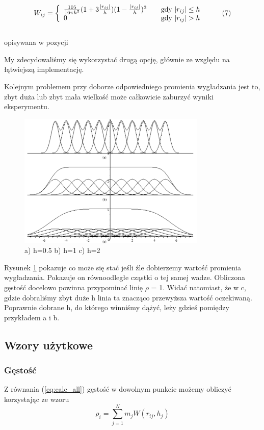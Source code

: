 \documentclass[polish, 12pt]{aghthesis}
\begin{document}
			\[ W_{ij} = \left\{
				\begin{array}{l l}
					\frac{105}{16 \pi h^5}(1 + 3 \frac{|r_{ij}|}{h})(1-\frac{|r_{ij}|}{h})^3 & \quad \text{gdy ${|r_{ij}| \leq h}$}  \\ 0 & \quad \text{gdy ${|r_{ij}| > h}$} 
				\end{array} \right.\ \label{eq:kernel_function} \tag{7}\]
			\ \\
			opisywana w pozycji \cite{Lucy}
			
			My zdecydowaliśmy się wykorzystać drugą opcję, głównie ze względu na łątwiejszą implementację. 
			
			Kolejnym problemem przy doborze odpowiedniego promienia wygładzania jest to, zbyt duża lub zbyt mała wielkość może całkowicie zaburzyć wyniki eksperymentu.
			\begin{figure}[h!]
			\centering
			\includegraphics[width=0.8\textwidth]{smoothing.png}
			\caption{a) h=0.5 b) h=1 c) h=2}
			\label{fig:smoothing}
			\end{figure}
			Rysunek \ref{fig:smoothing} pokazuje co może się stać jeśli źle dobierzemy wartość promienia wygładzania. Pokazuje on równoodległe cząstki o tej samej wadze. Obliczona gęstość docelowo powinna przypominać linię ${\rho}$ = 1. Widać natomiast, że w c, gdzie dobraliśmy zbyt duże h linia ta znacząco przewyższa wartość oczekiwaną. Poprawnie dobrane h, do którego winniśmy dążyć, leży gdzieś pomiędzy przykładem a i b.
			
		\subsection{Wzory użytkowe}
			\subsubsection{Gęstość}
			Z równania (\ref{eq:calc_all}) gęstość w dowolnym punkcie możemy obliczyć korzystając ze wzoru \[{\rho}_i=\sum_{j=1}^{N}m_jW(r_{ij},h_j) \label{eq:calc_density} \tag{8}\] 
\end{document}
